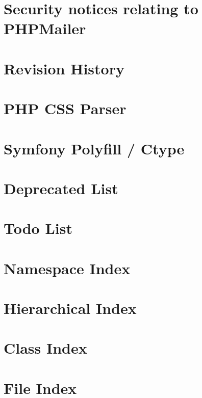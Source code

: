 \let\mypdfximage\pdfximage\def\pdfximage{\immediate\mypdfximage}\documentclass[twoside]{book}
\newcommand{\+}{\discretionary{\mbox{\scriptsize$\hookleftarrow$}}{}{}}
\begin{document}
\chapter{Security notices relating to PHPMailer}
\label{md_vendor_phpmailer_phpmailer__s_e_c_u_r_i_t_y}

\chapter{Revision History}
\label{md_vendor_sabberworm_php_css_parser__c_h_a_n_g_e_l_o_g}

\chapter{PHP CSS Parser}
\label{md_vendor_sabberworm_php_css_parser__r_e_a_d_m_e}

\chapter{Symfony Polyfill / Ctype}
\label{md_vendor_symfony_polyfill_ctype__r_e_a_d_m_e}

\chapter{Deprecated List}
\label{deprecated}

\chapter{Todo List}
\label{todo}

\chapter{Namespace Index}

\chapter{Hierarchical Index}

\chapter{Class Index}

\chapter{File Index}

\end{document}
